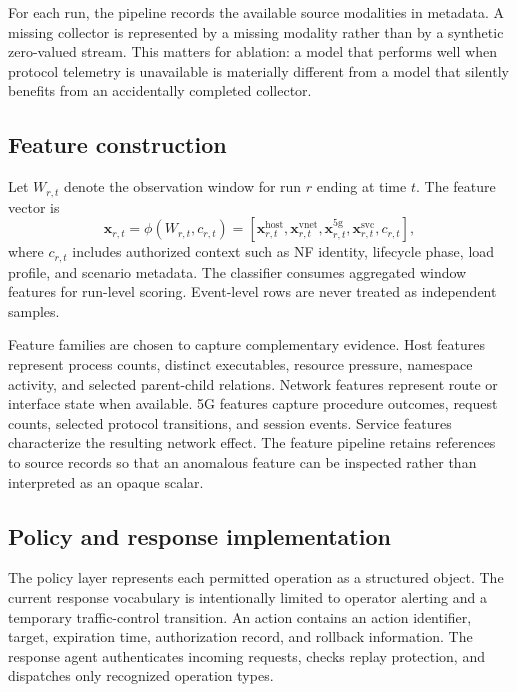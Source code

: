 \documentclass[sigconf,review]{acmart}
\begin{document}
For each run, the pipeline records the available source modalities in metadata. A missing collector is represented by a missing modality rather than by a synthetic zero-valued stream. This matters for ablation: a model that performs well when protocol telemetry is unavailable is materially different from a model that silently benefits from an accidentally completed collector.

\subsection{Feature construction}
Let $W_{r,t}$ denote the observation window for run $r$ ending at time $t$. The feature vector is
\begin{equation}
\mathbf{x}_{r,t}=\phi(W_{r,t},c_{r,t})=
[\mathbf{x}^{\mathrm{host}}_{r,t},\mathbf{x}^{\mathrm{vnet}}_{r,t},
\mathbf{x}^{\mathrm{5g}}_{r,t},\mathbf{x}^{\mathrm{svc}}_{r,t},c_{r,t}],
\end{equation}
where $c_{r,t}$ includes authorized context such as NF identity, lifecycle phase, load profile, and scenario metadata. The classifier consumes aggregated window features for run-level scoring. Event-level rows are never treated as independent samples.

Feature families are chosen to capture complementary evidence. Host features represent process counts, distinct executables, resource pressure, namespace activity, and selected parent-child relations. Network features represent route or interface state when available. 5G features capture procedure outcomes, request counts, selected protocol transitions, and session events. Service features characterize the resulting network effect. The feature pipeline retains references to source records so that an anomalous feature can be inspected rather than interpreted as an opaque scalar.

\subsection{Policy and response implementation}
The policy layer represents each permitted operation as a structured object. The current response vocabulary is intentionally limited to operator alerting and a temporary traffic-control transition. An action contains an action identifier, target, expiration time, authorization record, and rollback information. The response agent authenticates incoming requests, checks replay protection, and dispatches only recognized operation types.
\end{document}

